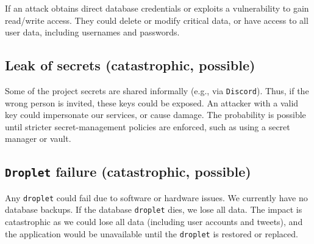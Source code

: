 If an attack obtains direct database credentials or exploits a 
vulnerability to gain read/write access. They could delete or modify 
critical data, or have access to all user data, including usernames 
and passwords.

\subsection{Leak of secrets (catastrophic, possible)}

Some of the project secrets are shared informally (e.g., via \texttt{Discord}). 
Thus, if the wrong person is invited, these keys could be exposed. 
An attacker with a valid key could impersonate our services, 
or cause damage. The probability is possible until stricter 
secret-management policies are enforced, 
such as using a secret manager or vault.

\subsection{\texttt{Droplet} failure (catastrophic, possible)}
Any \texttt{droplet} could fail due to software or hardware issues. We currently have 
no database backups. If the database \texttt{droplet} dies, we lose all data. 
The impact is catastrophic as we could lose all data (including user accounts 
and tweets), and the application would be unavailable until the \texttt{droplet} is 
restored or replaced.